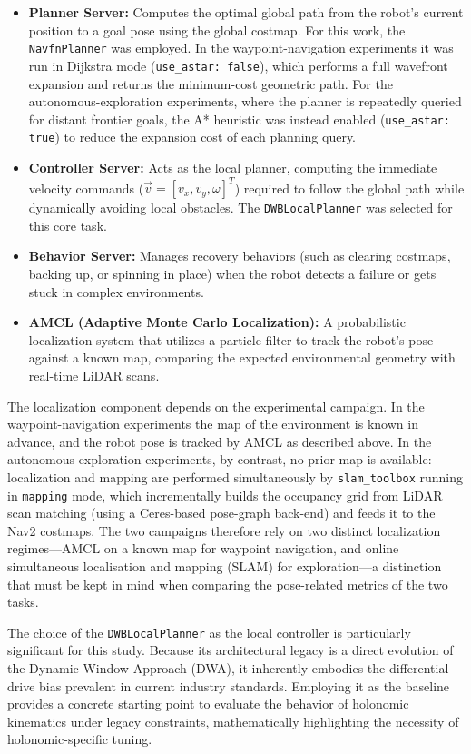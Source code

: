 \begin{itemize}
    \item \textbf{Planner Server:} Computes the optimal global path from the robot's current position to a goal pose using the global costmap. For this work, the \texttt{NavfnPlanner} was employed. In the waypoint-navigation experiments it was run in Dijkstra mode (\texttt{use\_astar: false}), which performs a full wavefront expansion and returns the minimum-cost geometric path. For the autonomous-exploration experiments, where the planner is repeatedly queried for distant frontier goals, the A* heuristic was instead enabled (\texttt{use\_astar: true}) to reduce the expansion cost of each planning query.
    \item \textbf{Controller Server:} Acts as the local planner, computing the immediate velocity commands ($\vec{v} = [v_x, v_y, \omega]^T$) required to follow the global path while dynamically avoiding local obstacles. The \texttt{DWBLocalPlanner} was selected for this core task.
    \item \textbf{Behavior Server:} Manages recovery behaviors (such as clearing costmaps, backing up, or spinning in place) when the robot detects a failure or gets stuck in complex environments.
    \item \textbf{AMCL (Adaptive Monte Carlo Localization):} A probabilistic localization system that utilizes a particle filter to track the robot's pose against a known map, comparing the expected environmental geometry with real-time LiDAR scans.
\end{itemize}

The localization component depends on the experimental campaign. In the \\ waypoint-navigation experiments the map of the environment is known in advance, and the robot pose is tracked by AMCL as described above. In the autonomous-exploration experiments, by contrast, no prior map is available: localization and mapping are performed simultaneously by \texttt{slam\_toolbox} running in \texttt{mapping} mode, which incrementally builds the occupancy grid from LiDAR scan matching (using a Ceres-based pose-graph back-end) and feeds it to the Nav2 costmaps. The two campaigns therefore rely on two distinct localization regimes---AMCL on a known map for waypoint navigation, and online simultaneous localisation and mapping (SLAM) for exploration---a distinction that must be kept in mind when comparing the pose-related metrics of the two tasks.

The choice of the \texttt{DWBLocalPlanner} as the local controller is particularly significant for this study. Because its architectural legacy is a direct evolution of the Dynamic Window Approach (DWA), it inherently embodies the differential-drive bias prevalent in current industry standards. Employing it as the baseline provides a concrete starting point to evaluate the behavior of holonomic kinematics under legacy constraints, mathematically highlighting the necessity of holonomic-specific tuning.


